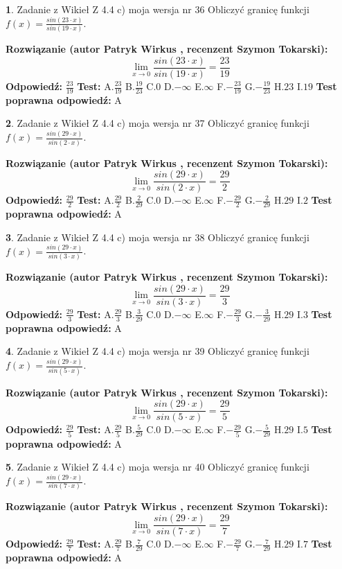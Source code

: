 \documentclass[12pt, a4paper]{article}
\theoremstyle{definition} %
\newtheorem{zad}{}
\newcommand{\zadStart}[1]{\begin{zad}#1\newline}
\newcommand{\zadStop}{\end{zad}}
\newcommand{\rozwStart}[2]{\noindent \textbf{Rozwiązanie (autor #1 , recenzent #2): }\newline}
\newcommand{\rozwStop}{\newline}
\newcommand{\odpStart}{\noindent \textbf{Odpowiedź:}\newline}
\newcommand{\odpStop}{\newline}
\newcommand{\testStart}{\noindent \textbf{Test:}\newline}
\newcommand{\testStop}{\newline}
\newcommand{\kluczStart}{\noindent \textbf{Test poprawna odpowiedź:}\newline}
\newcommand{\kluczStop}{\newline}
\begin{document}
\zadStart{Zadanie z Wikieł Z 4.4 c) moja wersja nr 36}
Obliczyć granicę funkcji $f(x)=\frac{sin(23\cdot x)}{sin(19\cdot x)}$.
\zadStop
\rozwStart{Patryk Wirkus}{Szymon Tokarski}
$$\lim\limits_{x\to 0}\frac{sin(23\cdot x)}{sin(19\cdot x)}=
\frac{23}{19}$$
\rozwStop
\odpStart
$\frac{23}{19}$
\odpStop
\testStart
A.$\frac{23}{19}$
B.$\frac{19}{23}$
C.$0$
D.$-\infty$
E.$\infty$
F.$-\frac{23}{19}$
G.$-\frac{19}{23}$
H.$23$
I.$19$
\testStop
\kluczStart
A
\kluczStop



\zadStart{Zadanie z Wikieł Z 4.4 c) moja wersja nr 37}
Obliczyć granicę funkcji $f(x)=\frac{sin(29\cdot x)}{sin(2\cdot x)}$.
\zadStop
\rozwStart{Patryk Wirkus}{Szymon Tokarski}
$$\lim\limits_{x\to 0}\frac{sin(29\cdot x)}{sin(2\cdot x)}=
\frac{29}{2}$$
\rozwStop
\odpStart
$\frac{29}{2}$
\odpStop
\testStart
A.$\frac{29}{2}$
B.$\frac{2}{29}$
C.$0$
D.$-\infty$
E.$\infty$
F.$-\frac{29}{2}$
G.$-\frac{2}{29}$
H.$29$
I.$2$
\testStop
\kluczStart
A
\kluczStop



\zadStart{Zadanie z Wikieł Z 4.4 c) moja wersja nr 38}
Obliczyć granicę funkcji $f(x)=\frac{sin(29\cdot x)}{sin(3\cdot x)}$.
\zadStop
\rozwStart{Patryk Wirkus}{Szymon Tokarski}
$$\lim\limits_{x\to 0}\frac{sin(29\cdot x)}{sin(3\cdot x)}=
\frac{29}{3}$$
\rozwStop
\odpStart
$\frac{29}{3}$
\odpStop
\testStart
A.$\frac{29}{3}$
B.$\frac{3}{29}$
C.$0$
D.$-\infty$
E.$\infty$
F.$-\frac{29}{3}$
G.$-\frac{3}{29}$
H.$29$
I.$3$
\testStop
\kluczStart
A
\kluczStop



\zadStart{Zadanie z Wikieł Z 4.4 c) moja wersja nr 39}
Obliczyć granicę funkcji $f(x)=\frac{sin(29\cdot x)}{sin(5\cdot x)}$.
\zadStop
\rozwStart{Patryk Wirkus}{Szymon Tokarski}
$$\lim\limits_{x\to 0}\frac{sin(29\cdot x)}{sin(5\cdot x)}=
\frac{29}{5}$$
\rozwStop
\odpStart
$\frac{29}{5}$
\odpStop
\testStart
A.$\frac{29}{5}$
B.$\frac{5}{29}$
C.$0$
D.$-\infty$
E.$\infty$
F.$-\frac{29}{5}$
G.$-\frac{5}{29}$
H.$29$
I.$5$
\testStop
\kluczStart
A
\kluczStop



\zadStart{Zadanie z Wikieł Z 4.4 c) moja wersja nr 40}
Obliczyć granicę funkcji $f(x)=\frac{sin(29\cdot x)}{sin(7\cdot x)}$.
\zadStop
\rozwStart{Patryk Wirkus}{Szymon Tokarski}
$$\lim\limits_{x\to 0}\frac{sin(29\cdot x)}{sin(7\cdot x)}=
\frac{29}{7}$$
\rozwStop
\odpStart
$\frac{29}{7}$
\odpStop
\testStart
A.$\frac{29}{7}$
B.$\frac{7}{29}$
C.$0$
D.$-\infty$
E.$\infty$
F.$-\frac{29}{7}$
G.$-\frac{7}{29}$
H.$29$
I.$7$
\testStop
\kluczStart
A
\kluczStop
\end{document}
